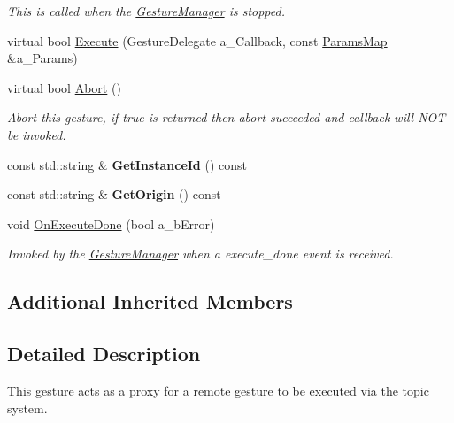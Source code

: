 \begin{DoxyCompactItemize}
\begin{DoxyCompactList}\small\item\em This is called when the \hyperlink{class_gesture_manager}{Gesture\+Manager} is stopped. \end{DoxyCompactList}\item 
virtual bool \hyperlink{class_proxy_gesture_a771b299c01bfaac71566e0c42353f3bf}{Execute} (Gesture\+Delegate a\+\_\+\+Callback, const \hyperlink{class_params_map}{Params\+Map} \&a\+\_\+\+Params)
\item 
\mbox{\label{class_proxy_gesture_a59d2fc62f2fac2a83efb97191de8799a}} 
virtual bool \hyperlink{class_proxy_gesture_a59d2fc62f2fac2a83efb97191de8799a}{Abort} ()
\begin{DoxyCompactList}\small\item\em Abort this gesture, if true is returned then abort succeeded and callback will N\+OT be invoked. \end{DoxyCompactList}\item 
\mbox{\label{class_proxy_gesture_a8ab917fe3907524d55712e69cebbfc6c}} 
const std\+::string \& {\bfseries Get\+Instance\+Id} () const
\item 
\mbox{\label{class_proxy_gesture_acd784bc6ac96bac8a17f2c42224a9b7a}} 
const std\+::string \& {\bfseries Get\+Origin} () const
\item 
\mbox{\label{class_proxy_gesture_a77bfad90466d834ef5604499063fdaa2}} 
void \hyperlink{class_proxy_gesture_a77bfad90466d834ef5604499063fdaa2}{On\+Execute\+Done} (bool a\+\_\+b\+Error)
\begin{DoxyCompactList}\small\item\em Invoked by the \hyperlink{class_gesture_manager}{Gesture\+Manager} when a execute\+\_\+done event is received. \end{DoxyCompactList}\end{DoxyCompactItemize}
\subsection*{Additional Inherited Members}


\subsection{Detailed Description}
This gesture acts as a proxy for a remote gesture to be executed via the topic system. 

